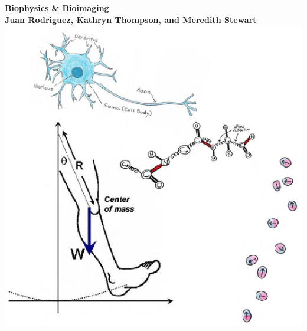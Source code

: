 \documentclass[12pt]{book}
\begin{document}
\begin{titlepage}
\centering
    \vfill
    {\bfseries\Huge
        Biophysics \& Bioimaging\\
        \vskip0.5cm
        \small
        Juan Rodriguez, Kathryn Thompson, and Meredith Stewart\\
    }    
\includegraphics[width=\textwidth]{./figures/cover.png}
\end{titlepage}
\tableofcontents

\end{document}
